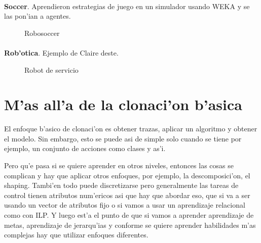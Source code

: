 \documentclass[11pt]{article}
\begin{document}
\paragraph{}
\noindent
\textbf{Soccer}. Aprendieron estrategias de juego en un simulador usando WEKA y se las pon'ian a agentes.

\begin{figure}[h]

\centering
{}
\caption[Robosoccer]{Robosoccer} 
\label{fig:robosoc}

\end{figure}


\paragraph{}
\noindent
\textbf{Rob'otica}. Ejemplo de Claire deste.

\begin{figure}[h]
\begin{center}

\caption{Robot de servicio}
  \label{fig:robotservicio}
\end{center}
\end{figure} 




\section{M'as all'a de la clonaci'on b'asica}
El enfoque b'asico de clonaci'on es obtener trazas, aplicar un algoritmo y obtener el modelo. Sin embargo, esto se puede asi de simple solo cuando se tiene por ejemplo, un conjunto de acciones como clases y as'i. 

Pero qu'e pasa si se quiere aprender en otros niveles, entonces las cosas se complican y hay que aplicar otros enfoques, por ejemplo, la descomposici'on, el shaping. Tambi'en todo puede discretizarse pero generalmente las tareas de control tienen atributos num'ericos asi que hay que abordar eso, que si va a ser usando un vector de atributos fijo o si vamos a usar un aprendizaje relacional como con ILP. Y luego est'a el punto de que si vamos a aprender aprendizaje de metas, aprendizaje de jerarqu'ias y conforme se quiere aprender habilidades m'as complejas hay que utilizar enfoques diferentes.
\end{document}
